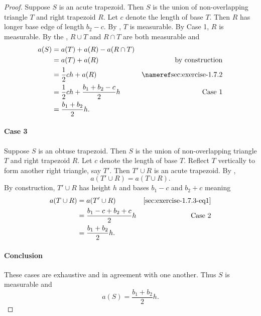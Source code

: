 \documentclass{report}
\begin{document}
\begin{proof}
    Suppose $S$ is an acute trapezoid.
    Then $S$ is the union of non-overlapping triangle $T$ and right trapezoid $R$.
    Let $c$ denote the length of base $T$.
    Then $R$ has longer base edge of length $b_2 - c$.
    By , $T$ is measurable.
    By Case 1, $R$ is measurable.
    By the , $R \cup T$ and $R \cap T$ are
      both measurable and
      \begin{align*}
        a(S)
          & = a(T) + a(R) - a(R \cap T) \\
          & = a(T) + a(R) & \text{by construction} \\
          & = \frac{1}{2}ch + a(R) & \textref{sec:exercise-1.7.2} \\
          & = \frac{1}{2}ch + \frac{b_1 + b_2 - c}{2}h & \text{Case 1} \\
          & = \frac{b_1 + b_2}{2}h.
      \end{align*}

  \paragraph{Case 3}%

    Suppose $S$ is an obtuse trapezoid.
    Then $S$ is the union of non-overlapping triangle $T$ and right trapezoid $R$.
    Let $c$ denote the length of base $T$.
    Reflect $T$ vertically to form another right triangle, say $T'$.
    Then $T' \cup R$ is an acute trapezoid.
    By ,
      \begin{equation}
        \label{sec:exercise-1.7.3-eq1}
        \tag{3.1}
        a(T' \cup R) = a(T \cup R).
      \end{equation}
    By construction, $T' \cup R$ has height $h$ and bases $b_1 - c$ and $b_2 + c$
      meaning
      \begin{align*}
        a(T \cup R)
          & = a(T' \cup R) & \eqref{sec:exercise-1.7.3-eq1} \\
          & = \frac{b_1 - c + b_2 + c}{2}h & \text{Case 2} \\
          & = \frac{b_1 + b_2}{2}h.
      \end{align*}

  \paragraph{Conclusion}%

    These cases are exhaustive and in agreement with one another.
    Thus $S$ is measurable and $$a(S) = \frac{b_1 + b_2}{2}h.$$


\end{proof}
\end{document}
